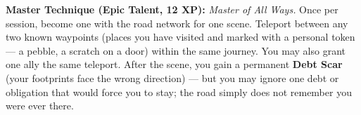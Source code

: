 \begin{tcolorbox}[colback=black!5,colframe=blue!70!black,title=\textbf{Way-Walker (The Traveler)},breakable]
  \vspace{2mm}
  \noindent\textbf{Master Technique (Epic Talent, 12 XP):}
  \textit{Master of All Ways.} Once per session, become one with the road network for one scene. Teleport between any two known waypoints (places you have visited and marked with a personal token --- a pebble, a scratch on a door) within the same journey. You may also grant one ally the same teleport. After the scene, you gain a permanent \textbf{Debt Scar} (your footprints face the wrong direction) --- but you may ignore one debt or obligation that would force you to stay; the road simply does not remember you were ever there.
\end{tcolorbox}